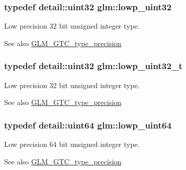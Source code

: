 \subsubsection[{lowp\+\_\+uint32}]{\setlength{\rightskip}{0pt plus 5cm}typedef {\bf detail\+::uint32} {\bf glm\+::lowp\+\_\+uint32}}\label{group__gtc__type__precision_gaf11e85af414720b4cd12bd57b3a81e68}
Low precision 32 bit unsigned integer type. \begin{DoxySeeAlso}{See also}
\hyperlink{group__gtc__type__precision}{G\+L\+M\+\_\+\+G\+T\+C\+\_\+type\+\_\+precision} 
\end{DoxySeeAlso}
\hypertarget{group__gtc__type__precision_ga9f8cb602a358e1f48bda2682cf051f0c}{}
\subsubsection[{lowp\+\_\+uint32\+\_\+t}]{\setlength{\rightskip}{0pt plus 5cm}typedef {\bf detail\+::uint32} {\bf glm\+::lowp\+\_\+uint32\+\_\+t}}\label{group__gtc__type__precision_ga9f8cb602a358e1f48bda2682cf051f0c}
Low precision 32 bit unsigned integer type. \begin{DoxySeeAlso}{See also}
\hyperlink{group__gtc__type__precision}{G\+L\+M\+\_\+\+G\+T\+C\+\_\+type\+\_\+precision} 
\end{DoxySeeAlso}
\hypertarget{group__gtc__type__precision_gacf666a9d9b309c4615c7a4f2ab0be289}{}
\subsubsection[{lowp\+\_\+uint64}]{\setlength{\rightskip}{0pt plus 5cm}typedef detail\+::uint64 {\bf glm\+::lowp\+\_\+uint64}}\label{group__gtc__type__precision_gacf666a9d9b309c4615c7a4f2ab0be289}
Low precision 64 bit unsigned integer type. \begin{DoxySeeAlso}{See also}
\hyperlink{group__gtc__type__precision}{G\+L\+M\+\_\+\+G\+T\+C\+\_\+type\+\_\+precision} 
\end{DoxySeeAlso}
\hypertarget{group__gtc__type__precision_gabf3069d4f188557a87b1d7f35eb0a270}{}

